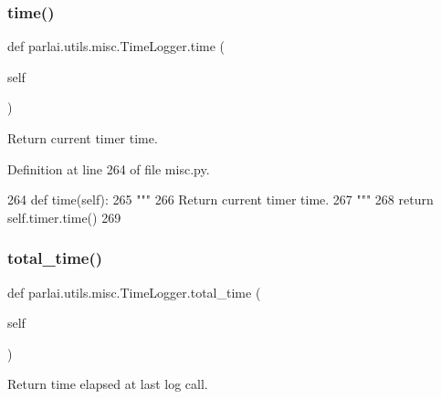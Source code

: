 \mbox{\label{classparlai_1_1utils_1_1misc_1_1TimeLogger_aa8e859dc10c12159501bbf545ca62a51}} 
\subsubsection{\texorpdfstring{time()}{time()}}
{\footnotesize\ttfamily def parlai.\+utils.\+misc.\+Time\+Logger.\+time (\begin{DoxyParamCaption}\item[{}]{self }\end{DoxyParamCaption})}

\begin{DoxyVerb}Return current timer time.
\end{DoxyVerb}
 

Definition at line 264 of file misc.\+py.


\begin{DoxyCode}
264     \textcolor{keyword}{def }time(self):
265         \textcolor{stringliteral}{"""}
266 \textcolor{stringliteral}{        Return current timer time.}
267 \textcolor{stringliteral}{        """}
268         \textcolor{keywordflow}{return} self.timer.time()
269 
\end{DoxyCode}
\mbox{\label{classparlai_1_1utils_1_1misc_1_1TimeLogger_a18d3faec4442ed5b313c88d566f43b2d}} 
\subsubsection{\texorpdfstring{total\+\_\+time()}{total\_time()}}
{\footnotesize\ttfamily def parlai.\+utils.\+misc.\+Time\+Logger.\+total\+\_\+time (\begin{DoxyParamCaption}\item[{}]{self }\end{DoxyParamCaption})}

\begin{DoxyVerb}Return time elapsed at last log call.
\end{DoxyVerb}
 

